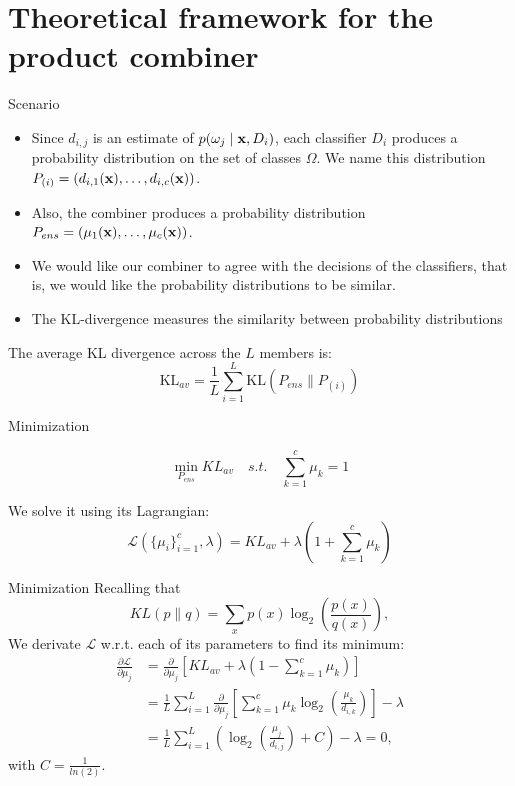 \documentclass[xcolor=table]{beamer}
\begin{document}
\section{Theoretical framework for the product combiner}

\begin{frame}{Scenario}
    \begin{itemize}

        \item Since \(d_{i,j}\) is an estimate of  \(p(\omega_j \mid {\mathbf x}, D_i)\), each classifier \(D_i\) produces a probability distribution on the set of classes \(\Omega\). We name this distribution \(P_{(i)} = (d_{i,1}({\mathbf x}),\dots,d_{i,c}({\mathbf x}))\).
        \pause
        \item Also, the combiner produces a probability distribution \(P_{ens} = (\mu_1({\mathbf x}), \dots,\mu_c({\mathbf x}))\).
        \pause
        \item We would like our combiner to agree with the decisions of the classifiers, that is, we would like the probability distributions to be similar.
        \pause
        \item The KL-divergence measures the similarity between probability distributions
    \end{itemize}
    \pause
    The average KL divergence across the \(L\) members is:
    \[
    \text{KL}_{av} = \frac{1}{L} \sum_{i=1}^L \text{KL}(P_{ens} \parallel P_{(i)})
    \]
\end{frame}

\begin{frame}{Minimization}
    \begin{problem}
    \[
    \min_{P_{ens}} KL_{av}\quad s.t. \quad \sum_{k=1}^c \mu_k = 1
    \]
    \end{problem}
    \pause
    We solve it using its Lagrangian:
    \\
    \[
    \mathcal L (\{\mu_i\}_{i=1}^c, \lambda) = KL_{av} + \lambda \left(1 + \sum_{k=1}^c \mu_k\right)
    \]
    
\end{frame}

\begin{frame}{Minimization}
Recalling that 
\[
KL(p \parallel q) = \sum_{x}p(x) \log_2 \left(\frac{p(x)}{q(x)}\right),
\]
\pause
We derivate \(\mathcal L\) w.r.t. each of its parameters to find its minimum:
\begin{align*}
\frac{\partial \mathcal L}{\partial \mu_j} & = \frac{\partial}{\partial \mu_j} \left[ KL_{av} + \lambda \left(1 - \sum_{k=1}^c \mu_k\right)\right]\\
& = \frac{1}{L} \sum_{i=1}^L \frac{\partial}{\partial \mu_j} \left[\sum_{k=1}^c\mu_k \log_2 \left(\frac{\mu_k}{d_{i,k}}\right)\right] - \lambda\\
& = \frac{1}{L} \sum_{i=1}^L \left(\log_2 \left(\frac{\mu_j}{d_{i,j}}\right) + C\right) - \lambda = 0,
\end{align*}
with \(C = \frac{1}{ln(2)}\).
\end{frame}
\end{document}
